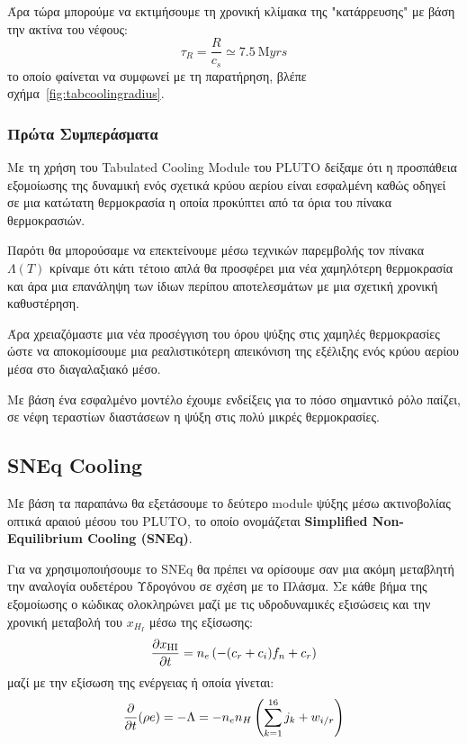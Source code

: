 \documentclass[article,a4paper,11.2pt]{memoir}
\numberwithin{equation}{subsection}
\begin{document}
	Άρα τώρα μπορούμε να εκτιμήσουμε τη χρονική κλίμακα της "κατάρρευσης" με βάση την ακτίνα του νέφους:
	\begin{equation}
	\tau_R=\frac{R}{c_s} \simeq \SI{7.5}{\mega yrs}
	\end{equation}
	το οποίο φαίνεται να συμφωνεί με τη παρατήρηση, βλέπε σχήμα~\ref{fig:tabcoolingradius}.
	
	\subsubsection{Πρώτα Συμπεράσματα}
	Με τη χρήση του Tabulated Cooling Module του PLUTO δείξαμε ότι η προσπάθεια εξομοίωσης της δυναμική ενός σχετικά κρύου αερίου είναι εσφαλμένη καθώς οδηγεί σε μια κατώτατη θερμοκρασία η οποία προκύπτει από τα όρια του πίνακα θερμοκρασιών.
	
	Παρότι θα μπορούσαμε να επεκτείνουμε μέσω τεχνικών παρεμβολής τον πίνακα  $\Lambda (T)$ κρίναμε ότι κάτι τέτοιο απλά θα προσφέρει μια νέα χαμηλότερη θερμοκρασία και άρα μια επανάληψη των ίδιων περίπου αποτελεσμάτων με μια σχετική χρονική καθυστέρηση. 
	
	Άρα χρειαζόμαστε μια νέα προσέγγιση του όρου ψύξης στις χαμηλές θερμοκρασίες ώστε να αποκομίσουμε μια ρεαλιστικότερη απεικόνιση της εξέλιξης ενός κρύου αερίου μέσα στο διαγαλαξιακό μέσο.  
	
	Με βάση ένα εσφαλμένο μοντέλο έχουμε ενδείξεις για το πόσο σημαντικό ρόλο παίζει, σε νέφη τεραστίων διαστάσεων η ψύξη στις πολύ μικρές θερμοκρασίες. 
	
	\subsection{SNEq Cooling}
	Με βάση τα παραπάνω θα εξετάσουμε το δεύτερο module ψύξης μέσω ακτινοβολίας οπτικά αραιού μέσου του PLUTO, το οποίο ονομάζεται \textbf{Simplified Non-Equilibrium Cooling (SNEq)}. 
	
	Για να χρησιμοποιήσουμε το SNEq θα πρέπει να ορίσουμε σαν μια ακόμη μεταβλητή την
	αναλογία ουδετέρου Υδρογόνου σε σχέση με το Πλάσμα.
	Σε κάθε βήμα της εξομοίωσης ο κώδικας ολοκληρώνει μαζί με τις υδροδυναμικές εξισώσεις και την χρονική μεταβολή του $x_{H_I}$ μέσω της εξίσωσης:
	\begin{equation}
	\pdv{x_{\ce{HI}}}{t}=n_e \left( -(c_r+c_i)f_n+c_r\right) 
	\end{equation}
	μαζί με την εξίσωση της ενέργειας ή οποία γίνεται:
	\begin{equation}
	\pdv{t}(\rho e)=-\Lambda=-n_e n_H \left( \sum\limits_{k=1}^{16}j_k +w_{i/r} \right) 
	\end{equation}
	
\end{document}
